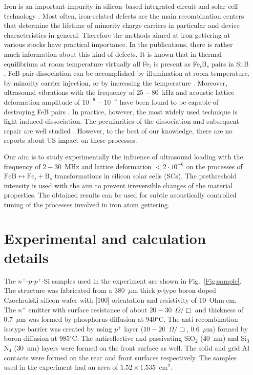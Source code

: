 \documentclass[%
 aip,jap,
 amsmath,amssymb,
 reprint,%
]{revtex4-1}
\begin{document}
Iron is an important impurity in silicon--based integrated circuit and solar cell technology \cite{Istratov2000}.
Most often, iron-related defects are the main recombination centers that determine the lifetime of  minority charge carriers in particular and device characteristics in general.
Therefore the methods aimed at iron gettering at various stocks have practical importance.
In the publications, there is rather much information about this kind of defects.
It is known that in thermal equilibrium at room temperature virtually all Fe$_i$ is present as Fe$_i$B$_s$ pairs in Si:B \cite{FeBLight2,FeBJAP2005}.
FeB pair dissociation can be accomplished by illumination at room temperature, by minority carrier injection, or by increasing the temperature \cite{FeBLight2,FeBAssJAP2014,FeB_Zong}.
Moreover, ultrasound  vibrations with the frequency of $25-80$~kHz and acoustic lattice deformation amplitude of $10^{-6}-10^{-5}$ have been found to be capable of destroying FeB pairs \cite{Ostapenko1995SST,Ostapenko1994APL}.
In practice, however, the most widely used technique is light-induced dissociation.
The peculiarities of the dissociation and subsequent repair are well studied \cite{FeBLight2,FeBKin2019,FeBAssJAP2014,FeBJAP2005,FeBAssSST2011,lauer2016,FeBStrongIll,FeBkinAPL2008,FeBKinAPL2013}. However, to the best of our knowledge, there are no reports about US impact on these processes.

Our aim is to study experimentally the influence of ultrasound loading with the
frequency of $2-30$~MHz and  lattice deformation $<2\cdot10^{-6}$ on the
processes of $\mathrm{FeB}\leftrightarrow\mathrm{Fe}_i+\mathrm{B}_s$ transformations in silicon solar cells (SCs).
The prethreshold intensity is used with the aim to prevent irreversible changes of the material properties.
The obtained results can be used for subtle acoustically controlled tuning of the processes involved in iron atom gettering.

\section{\label{sec:Exp}Experimental and calculation details}


The $n^+$-$p$-$p^+$-Si samples used in the experiment are shown in Fig.~\ref{Fig:sample}.
The structure was fabricated from a 380~$\mu$m thick $p$-type boron doped
Czochralski silicon wafer with [100] orientation and resistivity of 10~Ohm$\cdot$cm.
The $n^+$ emitter with surface resistance of about $20-30$~$\Omega/\Box$
and  thickness of $0.7$~$\mu$m was formed by phosphorus diffusion at 940$^\circ$C.
The anti-recombination isotype barrier was created by using $p^+$
layer ($10-20$~$\Omega/\Box$, $0.6$~$\mu$m) formed by boron diffusion at 985$^\circ$C.
The antireflective and passivating SiO$_2$ (40~nm) and Si$_3$N$_4$ (30~nm) layers
were formed on the front surface as well.
The solid and grid Al contacts were formed on the rear and front surfaces respectively.
The samples used in the experiment had an area of $1.52\times1.535$~cm$^2$.
\end{document}
